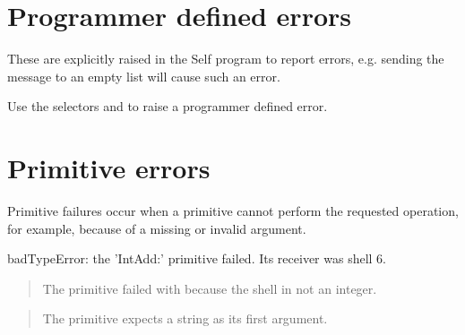\documentclass[letterpaper,10pt,english]{sphinxmanual}
\begin{document}
\section{Programmer defined errors}
\label{\detokenize{vmref:programmer-defined-errors}}
These are explicitly raised in the Self program to report errors, e.g. sending the message 
to an empty list will cause such an error.

\begin{sphinxVerbatim}[commandchars=\\\{\}]
   
   
\end{sphinxVerbatim}

Use the selectors  and  to raise a programmer defined error.


\section{Primitive errors}
\label{\detokenize{vmref:primitive-errors}}
Primitive failures occur when a primitive cannot perform the requested operation, for example, because
of a missing or invalid argument.

\begin{sphinxVerbatim}[commandchars=\\\{\}]
badTypeError: the ’\PYGZus{}IntAdd:’ primitive failed.
Its receiver was shell \PYGZlt{}6\PYGZgt{}.
\end{sphinxVerbatim}
\begin{quote}

The primitive failed with  because the shell in not an integer.
\end{quote}

\begin{sphinxVerbatim}[commandchars=\\\{\}]
              
\end{sphinxVerbatim}
\begin{quote}

The primitive  expects a string as its first argument.
\end{quote}
\end{document}
